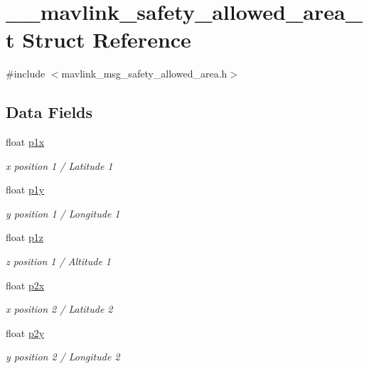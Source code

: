 \hypertarget{struct____mavlink__safety__allowed__area__t}{\section{\+\_\+\+\_\+mavlink\+\_\+safety\+\_\+allowed\+\_\+area\+\_\+t Struct Reference}
\label{struct____mavlink__safety__allowed__area__t}
}


{\ttfamily \#include $<$mavlink\+\_\+msg\+\_\+safety\+\_\+allowed\+\_\+area.\+h$>$}

\subsection*{Data Fields}
\begin{DoxyCompactItemize}
\item 
float \hyperlink{struct____mavlink__safety__allowed__area__t_ae919b7b7d619c59c1cd250efb99b0417}{p1x}
\begin{DoxyCompactList}\small\item\em x position 1 / Latitude 1 \end{DoxyCompactList}\item 
float \hyperlink{struct____mavlink__safety__allowed__area__t_a31433025a6ccc7032b9142172824339a}{p1y}
\begin{DoxyCompactList}\small\item\em y position 1 / Longitude 1 \end{DoxyCompactList}\item 
float \hyperlink{struct____mavlink__safety__allowed__area__t_ad1c4edfad8de3bcc22fa3c18d14fc101}{p1z}
\begin{DoxyCompactList}\small\item\em z position 1 / Altitude 1 \end{DoxyCompactList}\item 
float \hyperlink{struct____mavlink__safety__allowed__area__t_a6a558f454d61143884a162cf3710308e}{p2x}
\begin{DoxyCompactList}\small\item\em x position 2 / Latitude 2 \end{DoxyCompactList}\item 
float \hyperlink{struct____mavlink__safety__allowed__area__t_a4e149f8f37b1d5987602ac3e49a65a66}{p2y}
\begin{DoxyCompactList}\small\item\em y position 2 / Longitude 2 \end{DoxyCompactList}\item 

\end{DoxyCompactItemize}
